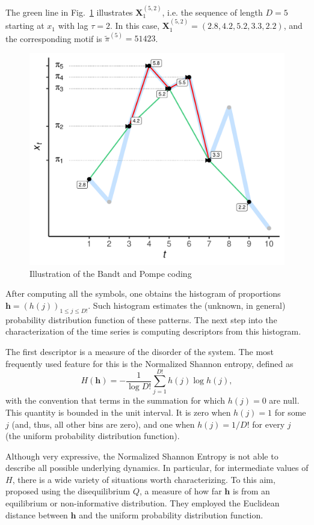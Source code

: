 \documentclass[12pt]{article}
\begin{document}
	The green line in Fig.~\ref{Fig:IntroBP} illustrates $\mathbf X_{1}^{(5,2)}$, i.e. the sequence of length $D=5$ starting at $x_1$ with lag $\tau=2$.
	In this case, $\mathbf X_{1}^{(5,2)}= (2.8, 4.2, 5.2, 3.3, 2.2)$, and the corresponding motif is $\widetilde{\pi}^{(5)}=51423$.
	
	\begin{figure}[hbt]
		\centering
		\includegraphics[width=.7\linewidth]{IntroBP}
		\caption{Illustration of the Bandt and Pompe coding}
		\label{Fig:IntroBP}
	\end{figure}
	
	After computing all the symbols, one obtains the histogram of proportions $\bm h = (h(j))_{1\leq j\leq D!}$.
	Such histogram estimates the (unknown, in general) probability distribution function of these patterns.
	The next step into the characterization of the time series is computing descriptors from this histogram.
	
	The first descriptor is a measure of the disorder of the system.
	The most frequently used feature for this is the Normalized Shannon entropy, defined as
	\begin{equation}
		H(\bm h) = -\frac{1}{\log D!} \sum_{j=1}^{D!} h(j) \log h(j),
	\end{equation}
	with the convention that terms in the summation for which $h(j)=0$ are null.
	This quantity is bounded in the unit interval. 
	It is zero when $h(j)=1$ for some $j$ (and, thus, all other bins are zero), and one when $h(j)=1/D!$ for every $j$ (the uniform probability distribution function).
	
	Although very expressive, the Normalized Shannon Entropy is not able to describe all possible underlying dynamics.
	In particular, for intermediate values of $H$, there is a wide variety of situations worth characterizing.
	To this aim, \citet{LopezRuiz1995} proposed using the disequilibrium  $Q$, a measure of how far $\bm h$ is from an equilibrium or non-informative distribution.
	They employed the Euclidean distance between $\bm h$ and the uniform probability distribution function.
	
\end{document}
